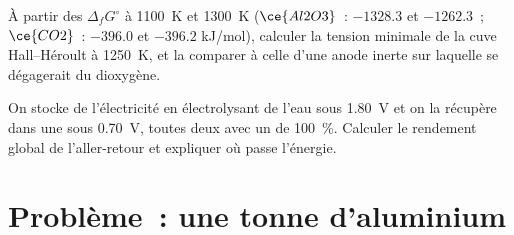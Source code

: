 \begin{exercise}[$\star\star\star$]\label{exo:b2:batteries-electrolysis:11}
À partir des $\Delta_f G^\circ$ à \qty{1100}{K} et \qty{1300}{K} ($\ce{Al2O3}$~: $-1328.3$ et
$-1262.3$~; $\ce{CO2}$~: $-396.0$ et $-396.2$ \unit{kJ/mol}), calculer la tension
minimale de la cuve Hall--Héroult à \qty{1250}{K}, et la comparer à celle d'une
anode inerte sur laquelle se dégagerait du dioxygène.
\end{exercise}

\begin{exercise}[$\star\star\star$]\label{exo:b2:batteries-electrolysis:12}
On stocke de l'électricité en électrolysant de l'eau sous \qty{1.80}{V} et on la récupère dans une
 sous \qty{0.70}{V}, toutes deux avec un  de 100~\%. Calculer le
rendement global de l'aller-retour et expliquer où passe l'énergie.
\end{exercise}

\section{Problème~: une tonne d'aluminium}

